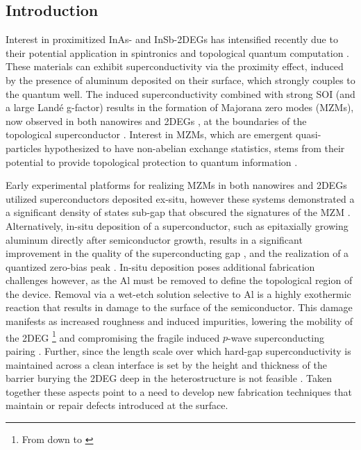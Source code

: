 \subsection{\label{sec:surf_intro}Introduction}

Interest in proximitized InAs- and InSb-2DEGs has intensified recently due to their potential application in spintronics \cite{spintronics} and topological quantum computation \cite{PhysRevLett.105.077001,s41578-018-0003-1}. These materials can exhibit superconductivity via the proximity effect, induced by the presence of aluminum deposited on their surface, which strongly couples to the quantum well. The induced superconductivity combined with strong SOI (and a large Land\'e g-factor) results in the formation of Majorana zero modes (MZMs), now observed in both nanowires \cite{Mourik1003,AlbrechtNature} and 2DEGs \cite{PhysRevLett.119.136803,PhysRevLett.119.176805}, at the boundaries of the topological superconductor \cite{RevModPhys.83.1057,Kitaev_2001,doi:10.1146/030212-184337}. Interest in MZMs, which are emergent quasi-particles hypothesized to have non-abelian exchange statistics, stems from their potential to provide topological protection to quantum information \cite{RevModPhys.80.1083}.

Early experimental platforms for realizing MZMs in both nanowires and 2DEGs utilized superconductors deposited ex-situ, however these systems demonstrated a a significant density of states sub-gap that obscured the signatures of the MZM \cite{PhysRevB.88.064506,PhysRevLett.110.186803}. Alternatively, in-situ deposition of a superconductor, such as epitaxially growing aluminum directly after semiconductor growth, results in a significant improvement in the quality of the superconducting gap \cite{nnano.2014.306,hard_gap_2deg}, and the realization of  a quantized zero-bias peak \cite{nature26142}. In-situ deposition poses additional fabrication challenges however, as the Al must be removed to define the topological region of the device. Removal via a wet-etch solution selective to Al is a highly exothermic reaction that results in damage to the surface of the semiconductor. This damage manifests as increased roughness and induced impurities, lowering the mobility of the 2DEG \footnote{From  \cite{shabani_transport} down to  \cite{hard_gap_2deg,PhysRevLett.115.127001}} and compromising the fragile induced $p$-wave superconducting pairing \cite{PhysRevB.83.184520,PhysRevB.85.140513}. Further, since the length scale over which hard-gap superconductivity is maintained across a clean interface is set by the height and thickness of the barrier \cite{PhysRevLett.110.186803} burying the 2DEG deep in the heterostructure is not feasible \cite{PhysRevB.93.155402}. Taken together these aspects point to a need to develop new fabrication techniques that maintain or repair defects introduced at the surface.

